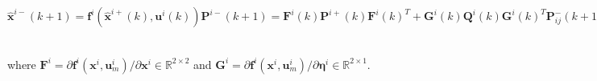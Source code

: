 \documentclass[conference]{IEEEtran}
\begin{document}
\begin{subequations}
	\begin{equation}
	\hat{\boldsymbol{x}}^{i-}(k+1) = \boldsymbol{f}^i(\hat{\boldsymbol{x}}^{i+}(k),\boldsymbol{u}^i(k))
	\label{equ::CEKF_main_xprop}
	\end{equation}
	\begin{equation}
	\boldsymbol{P}^{i-}(k+1) = \boldsymbol{F}^i(k)\boldsymbol{P}^{i+}(k)\boldsymbol{F}^i(k)^T + \boldsymbol{G}^i(k)\boldsymbol{Q}^i(k)\boldsymbol{G}^i(k)^T
	\label{equ::CEKF_main_pprop}
	\end{equation}
	\begin{equation}
	\boldsymbol{P}_{ij}^-(k+1) = \boldsymbol{F}^i(k)\boldsymbol{P}_{ij}^+(k)\boldsymbol{F}^j(k)^T
	\label{equ::CEKF_main_corprop}
	\end{equation}
	\begin{equation}
	\hat{\boldsymbol{x}}^{i+}(k+1) = \hat{\boldsymbol{x}}^{i-}(k+1) + \boldsymbol{K}_i(k+1)\boldsymbol{r}^a(k+1)
	\label{equ::CEKF_main_xupdate}
	\end{equation}
	\begin{equation}
	\boldsymbol{P}^{i+}(k+1) = \boldsymbol{P}^{i-}(k+1) - \boldsymbol{K}_i(k+1)\boldsymbol{S}_{ab}(k+1)\boldsymbol{K}_i(k+1)^T
	\label{equ::CEKF_main_pupdate}
	\end{equation}
	\begin{equation}
	\boldsymbol{P}_{ij}^+(k+1) = \boldsymbol{P}_{ij}^-(k+1) - \boldsymbol{K}_i(k+1)\boldsymbol{S}_{ab}(k+1)\boldsymbol{K}_j(k+1)^T
	\label{equ::CEKF_main_corupdate}
	\end{equation}
	\begin{multline}
	\boldsymbol{K}_i(k+1) = \\
	\begin{cases}
	\boldsymbol{0}_{2\times2}, & \text{if no measurement} \\
	(\boldsymbol{P}_{ia}^-(k+1)\boldsymbol{H_a}^T + \boldsymbol{P}_{ib}^-(k+1)H_b^T)\boldsymbol{S}_{ab}^{-1}, &\text{if $a$ observes $b$} \\
	\boldsymbol{P}_{ia}^-(k+1)\boldsymbol{H}_{aa}^T \boldsymbol{S}_{aa}^{-1}, &\text{if $a$ observes itself}
	\end{cases}
	\label{equ::CEKF_main_gain}
	\end{multline}
	\label{equ::CEKF_main}
\end{subequations}
where $\boldsymbol{F}^i = \partial \boldsymbol{f}^i (\boldsymbol{x}^i,\boldsymbol{u}_m^i)/\partial \boldsymbol{x}^i \in\mathbb{R}^{2\times2}$ and $\boldsymbol{G}^i = \partial \boldsymbol{f}^i (\boldsymbol{x}^i,\boldsymbol{u}_m^i)/\partial \boldsymbol{\eta}^i\in\mathbb{R}^{2\times1}$.
\end{document}
